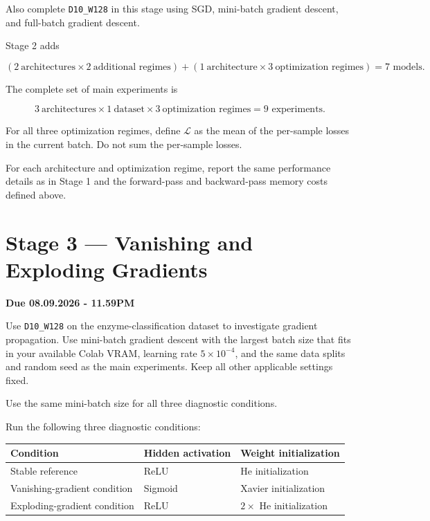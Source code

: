 \documentclass[11pt,a4paper]{article}
\newcommand{\code}[1]{\texttt{#1}}
\begin{document}
Also complete \code{D10\_W128} in this stage using SGD, mini-batch gradient descent, and full-batch gradient descent.

Stage 2 adds

\[
\left(
2\ \text{architectures}\times2\ \text{additional regimes}
\right)
+
\left(
1\ \text{architecture}\times3\ \text{optimization regimes}
\right)
=\boxed{7\text{ models}}.
\]

The complete set of main experiments is

\[
3\ \text{architectures}\times1\ \text{dataset}\times3\ \text{optimization regimes}
=\boxed{9\text{ experiments}}.
\]

For all three optimization regimes, define $\mathcal{L}$ as the mean of the per-sample losses in the current batch. Do not sum the per-sample losses.

For each architecture and optimization regime, report the same performance details as in Stage 1 and the forward-pass and backward-pass memory costs defined above.

\section{Stage 3 --- Vanishing and Exploding Gradients}

\textbf{Due 08.09.2026 - 11.59PM}

Use \code{D10\_W128} on the enzyme-classification dataset to investigate gradient propagation. Use mini-batch gradient descent with the largest batch size that fits in your available Colab VRAM, learning rate $5\times10^{-4}$, and the same data splits and random seed as the main experiments. Keep all other applicable settings fixed.

Use the same mini-batch size for all three diagnostic conditions.

Run the following three diagnostic conditions:

\begin{center}
\begin{tabular}{lll}
\toprule
\textbf{Condition} & \textbf{Hidden activation} & \textbf{Weight initialization} \\
\midrule
Stable reference & ReLU & He initialization \\
Vanishing-gradient condition & Sigmoid & Xavier initialization \\
Exploding-gradient condition & ReLU & $2\times$ He initialization \\
\bottomrule
\end{tabular}
\end{center}
\end{document}
